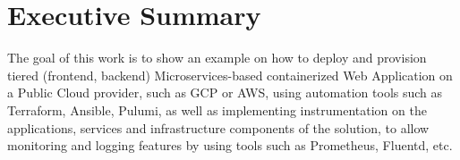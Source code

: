 \documentclass[12pt,a4paper,oneside]{report}
\begin{document}
\pagestyle{plain}

\cleardoublepage
\tableofcontents
\clearpage 
\begingroup 
    \let\clearpage\relax
    \let\cleardoublepage\relax
    \let\cleardoublepage\relax
\listoffigures
\endgroup
\chapter*{\tlangAcronyms}
\begin{acronym}[NGOSS]
\end{acronym}
\setcounter{page}{1}
%
%
\chapter{Executive Summary}
\label{chapter:introduction}
The goal of this work is to show an example on how to deploy and provision tiered (frontend, backend) Microservices-based containerized Web Application on a Public Cloud provider, such as \ac{GCP} or \ac{AWS}, using automation tools such as Terraform, Ansible, Pulumi, as well as implementing instrumentation on the applications, services and infrastructure components of the solution, to allow monitoring and logging features by using tools such as Prometheus, Fluentd, etc.
\end{document}

